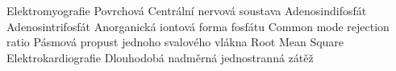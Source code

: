  {Elektromyografie}
 {Povrchová }
 {Centrální nervová soustava}
 {Adenosindifosfát}
 {Adenosintrifosfát}
 {Anorganická iontová forma fosfátu}
 {Common mode rejection ratio}
 {Pásmová propust}
 { jednoho svalového vlákna}
 {Root Mean Square}
 {Elektrokardiografie}
 {Dlouhodobá nadměrná jednostranná zátěž}
